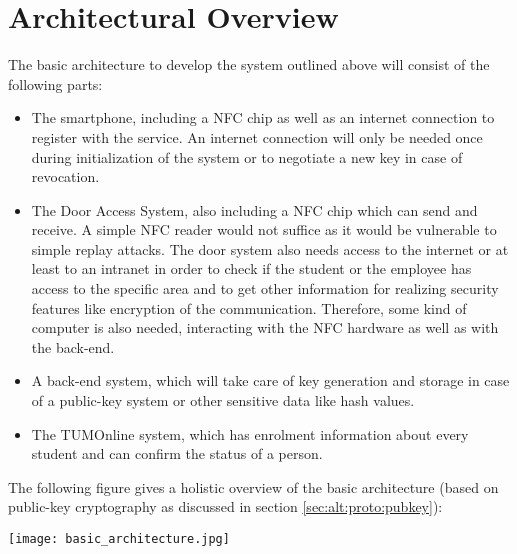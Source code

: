 \section{Architectural Overview}\label{sec:arch}

The basic architecture to develop the system outlined above will consist of the following parts:

\begin{itemize}
\item The smartphone, including a NFC chip as well as an internet connection to register with the service.
An internet connection will only be needed once during initialization of the system or to negotiate a new key in case of revocation.
\item The Door Access System, also including a NFC chip which can send and receive.
A simple NFC reader would not suffice as it would be vulnerable to simple replay attacks.
The door system also needs access to the internet or at least to an intranet in order to check if the student or the employee has access to the specific area and to get other information for realizing security features like encryption of the communication. Therefore, some kind of computer is also needed, interacting with the NFC hardware as well as with the back-end.
\item A back-end system, which will take care of key generation and storage in case of a public-key system or other sensitive data like hash values.

\item The TUMOnline system, which has enrolment information about every student and can confirm the status of a person.
\end{itemize} 
%
The following figure gives a holistic overview of the basic architecture (based on public-key cryptography as discussed in section \ref{sec:alt:proto:pubkey}): \newline
 \begin{center}
	\texttt{[image: basic\_architecture.jpg]}
\end{center}


